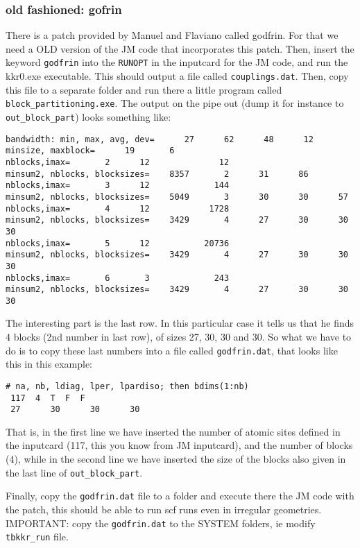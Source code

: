 \documentclass[a4paper,10pt,fullpage]{report}
\begin{document}
\subsubsection{old fashioned: gofrin}

There is 
a patch provided by Manuel and Flaviano called godfrin. For that we need a OLD version of the JM
code that incorporates this patch. Then, insert the keyword \verb|godfrin| into the \verb|RUNOPT|
in the inputcard for the JM code, and run the kkr0.exe executable. This should output 
a file called \verb|couplings.dat|. Then, copy this file to a separate folder and run there
a little program called  \verb|block_partitioning.exe|. The output on the pipe out (dump it for instance to
\verb|out_block_part|) looks something like:
\begin{verbatim}
bandwidth: min, max, avg, dev=      27      62      48      12
minsize, maxblock=      19       6
nblocks,imax=       2      12              12
minsum2, nblocks, blocksizes=    8357       2      31      86
nblocks,imax=       3      12             144
minsum2, nblocks, blocksizes=    5049       3      30      30      57
nblocks,imax=       4      12            1728
minsum2, nblocks, blocksizes=    3429       4      27      30      30      30
nblocks,imax=       5      12           20736
minsum2, nblocks, blocksizes=    3429       4      27      30      30      30
nblocks,imax=       6       3             243
minsum2, nblocks, blocksizes=    3429       4      27      30      30      30
\end{verbatim} 
The interesting part is the last row. In this particular case it tells us that he finds 4 blocks 
(2nd number in last row), of sizes 27, 30, 30 and 30. So what we have to do is to copy these last numbers
into a file called \verb|godfrin.dat|, that looks like this in this example:
\begin{verbatim}
# na, nb, ldiag, lper, lpardiso; then bdims(1:nb)
 117  4  T  F  F
 27      30      30      30
\end{verbatim}
That is, in the first line we have 
inserted the number of atomic sites defined in the inputcard (117, this you know from 
JM inputcard), and the number of blocks (4), while in the second line we have inserted 
the size of the blocks also given in the last line of \verb|out_block_part|.

Finally, copy the \verb|godfrin.dat| file to a folder and execute there the JM code
with the patch, this should be able to run scf runs even in irregular geometries.
IMPORTANT: copy the \verb|godfrin.dat| to the SYSTEM folders, ie modify \verb|tbkkr_run| file.
\end{document}
